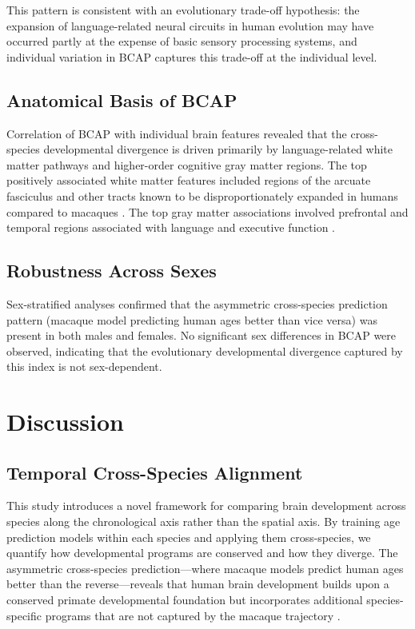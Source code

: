 \documentclass[12pt]{article}
\begin{document}
This pattern is consistent with an evolutionary trade-off hypothesis: the expansion of language-related neural circuits in human evolution may have occurred partly at the expense of basic sensory processing systems, and individual variation in BCAP captures this trade-off at the individual level.

\subsection{Anatomical Basis of BCAP}

Correlation of BCAP with individual brain features revealed that the cross-species developmental divergence is driven primarily by language-related white matter pathways and higher-order cognitive gray matter regions. The top positively associated white matter features included regions of the arcuate fasciculus and other tracts known to be disproportionately expanded in humans compared to macaques \citep{rilling2008evolution}. The top gray matter associations involved prefrontal and temporal regions associated with language and executive function \citep{cole2017global}.

\subsection{Robustness Across Sexes}

Sex-stratified analyses confirmed that the asymmetric cross-species prediction pattern (macaque model predicting human ages better than vice versa) was present in both males and females. No significant sex differences in BCAP were observed, indicating that the evolutionary developmental divergence captured by this index is not sex-dependent.

\section{Discussion}

\subsection{Temporal Cross-Species Alignment}

This study introduces a novel framework for comparing brain development across species along the chronological axis rather than the spatial axis. By training age prediction models within each species and applying them cross-species, we quantify how developmental programs are conserved and how they diverge. The asymmetric cross-species prediction---where macaque models predict human ages better than the reverse---reveals that human brain development builds upon a conserved primate developmental foundation but incorporates additional species-specific programs that are not captured by the macaque trajectory \citep{hill2010similar}.
\end{document}
